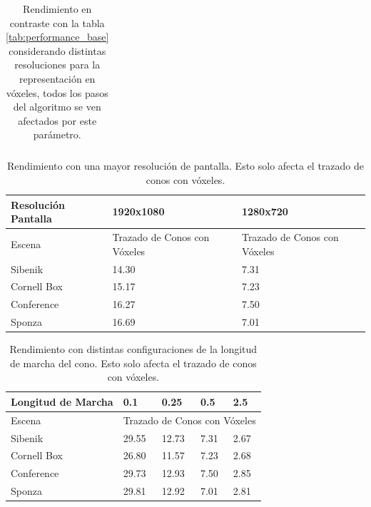 \begin{table}[H]
\begin{tabular}{lllllllllll}
\end{tabular}
\captionsetup{justification=centering}
\caption{Rendimiento en contraste con la tabla \ref{tab:performance_base} considerando distintas resoluciones para la representación en vóxeles, todos los pasos del algoritmo se ven afectados por este parámetro.}
\label{tab:performance_depth}
\end{table}
\begin{table}[H]
\centering
\begin{tabular}{|l|l|l|}
\hline
Resolución Pantalla  & 1920x1080                    & 1280x720                     \\ \hline
Escena      & Trazado de Conos con Vóxeles & Trazado de Conos con Vóxeles \\ \hline
Sibenik     & 14.30                        & 7.31                         \\
Cornell Box & 15.17                        & 7.23                         \\
Conference  & 16.27                        & 7.50                         \\
Sponza      & 16.69                        & 7.01                         \\ \hline
\end{tabular}
\captionsetup{justification=centering}
\caption{Rendimiento con una mayor resolución de pantalla. Esto solo afecta el trazado de conos con vóxeles.}
\label{tab:performance_display}
\end{table}
\begin{table}[H]
\centering
\begin{tabular}{|l|l|l|l|l|}
\hline
Longitud de Marcha & 0.1         & 0.25        & 0.5       & 2.5       \\ \hline
Escena             & \multicolumn{4}{l|}{Trazado de Conos con Vóxeles} \\ \hline
Sibenik            & 29.55       & 12.73       & 7.31      & 2.67      \\
Cornell Box        & 26.80       & 11.57       & 7.23      & 2.68      \\
Conference         & 29.73       & 12.93       & 7.50      & 2.85      \\
Sponza             & 29.81       & 12.92       & 7.01      & 2.81      \\ \hline\end{tabular}
\captionsetup{justification=centering}
\caption{Rendimiento con distintas configuraciones de la longitud de marcha del cono. Esto solo afecta el trazado de conos con vóxeles.}
\label{tab:performance_step}
\end{table}

